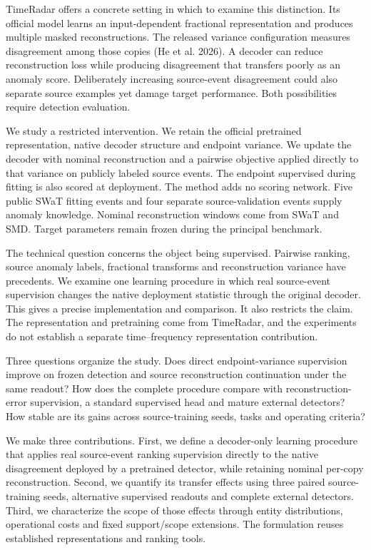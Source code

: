 \documentclass[
  english,
  10pt,
]{article}
\begin{document}
TimeRadar offers a concrete setting in which to examine this
distinction. Its official model learns an input-dependent fractional
representation and produces multiple masked reconstructions. The
released variance configuration measures disagreement among those copies
(He et al. 2026). A decoder can reduce reconstruction loss while
producing disagreement that transfers poorly as an anomaly score.
Deliberately increasing source-event disagreement could also separate
source examples yet damage target performance. Both possibilities
require detection evaluation.

We study a restricted intervention. We retain the official pretrained
representation, native decoder structure and endpoint variance. We
update the decoder with nominal reconstruction and a pairwise objective
applied directly to that variance on publicly labeled source events. The
endpoint supervised during fitting is also scored at deployment. The
method adds no scoring network. Five public SWaT fitting events and four
separate source-validation events supply anomaly knowledge. Nominal
reconstruction windows come from SWaT and SMD. Target parameters remain
frozen during the principal benchmark.

The technical question concerns the object being supervised. Pairwise
ranking, source anomaly labels, fractional transforms and reconstruction
variance have precedents. We examine one learning procedure in which
real source-event supervision changes the native deployment statistic
through the original decoder. This gives a precise implementation and
comparison. It also restricts the claim. The representation and
pretraining come from TimeRadar, and the experiments do not establish a
separate time--frequency representation contribution.

Three questions organize the study. Does direct endpoint-variance
supervision improve on frozen detection and source reconstruction
continuation under the same readout? How does the complete procedure
compare with reconstruction-error supervision, a standard supervised
head and mature external detectors? How stable are its gains across
source-training seeds, tasks and operating criteria?

We make three contributions. First, we define a decoder-only learning
procedure that applies real source-event ranking supervision directly to
the native disagreement deployed by a pretrained detector, while
retaining nominal per-copy reconstruction. Second, we quantify its
transfer effects using three paired source-training seeds, alternative
supervised readouts and complete external detectors. Third, we
characterize the scope of those effects through entity distributions,
operational costs and fixed support/scope extensions. The formulation
reuses established representations and ranking tools.
\end{document}
